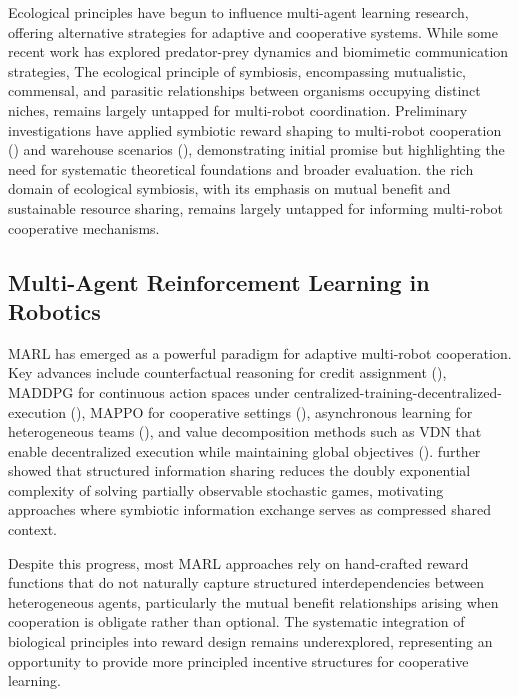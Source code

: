 \documentclass[Afour,sageh,times]{sagej}
\begin{document}
Ecological principles have begun to influence multi-agent learning research, offering alternative strategies for adaptive and cooperative systems. While some recent work has explored predator-prey dynamics and biomimetic communication strategies, The ecological principle of symbiosis, encompassing mutualistic, commensal, and parasitic relationships between organisms occupying distinct niches, remains largely untapped for multi-robot coordination. Preliminary investigations have applied symbiotic reward shaping to multi-robot cooperation (\cite{niu2025Investigating}) and warehouse scenarios (\cite{niu2025Enabling}), demonstrating initial promise but highlighting the need for systematic theoretical foundations and broader evaluation. the rich domain of ecological symbiosis, with its emphasis on mutual benefit and sustainable resource sharing, remains largely untapped for informing multi-robot cooperative mechanisms.

\subsection{Multi-Agent Reinforcement Learning in Robotics}
MARL has emerged as a powerful paradigm for adaptive multi-robot cooperation. Key advances include counterfactual reasoning for credit assignment (\cite{foerster2018Counterfactuala}), MADDPG for continuous action spaces under centralized-training-decentralized-execution (\cite{lowe2017Multiagent}), MAPPO for cooperative settings (\cite{yu2022Surprising}), asynchronous learning for heterogeneous teams (\cite{zhang2024Heterogeneous}), and value decomposition methods such as VDN that enable decentralized execution while maintaining global objectives (\cite{sunehag2018valuedecomposition}). \cite{liu2023Partially} further showed that structured information sharing reduces the doubly exponential complexity of solving partially observable stochastic games, motivating approaches where symbiotic information exchange serves as compressed shared context.

Despite this progress, most MARL approaches rely on hand-crafted reward functions that do not naturally capture structured interdependencies between heterogeneous agents,  particularly the mutual benefit relationships arising when cooperation is obligate rather than optional. The systematic integration of biological principles into reward design remains underexplored, representing an opportunity to provide more principled incentive structures for cooperative learning.
\end{document}
